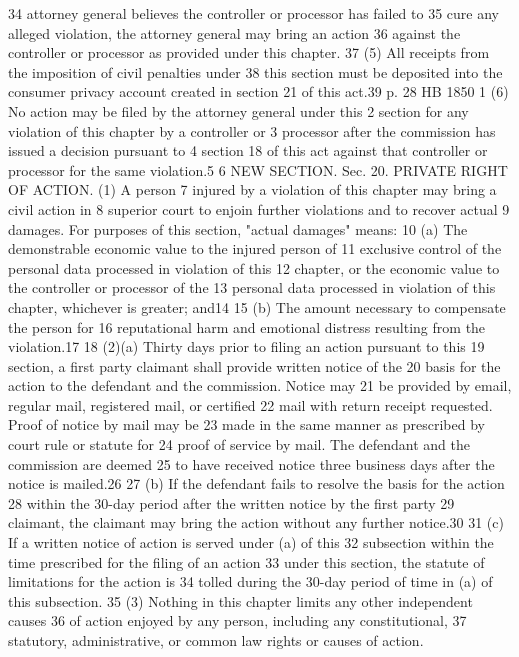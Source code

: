 34 attorney general believes the controller or processor has failed to
35 cure any alleged violation, the attorney general may bring an action
36 against the controller or processor as provided under this chapter.
37 (5) All receipts from the imposition of civil penalties under
38 this section must be deposited into the consumer privacy account
created in section 21 of this act.39
p. 28 HB 1850
1 (6) No action may be filed by the attorney general under this
2 section for any violation of this chapter by a controller or
3 processor after the commission has issued a decision pursuant to
4 section 18 of this act against that controller or processor for the
same violation.5
6 NEW SECTION. Sec. 20. PRIVATE RIGHT OF ACTION. (1) A person
7 injured by a violation of this chapter may bring a civil action in
8 superior court to enjoin further violations and to recover actual
9 damages. For purposes of this section, "actual damages" means:
10 (a) The demonstrable economic value to the injured person of
11 exclusive control of the personal data processed in violation of this
12 chapter, or the economic value to the controller or processor of the
13 personal data processed in violation of this chapter, whichever is
greater; and14
15 (b) The amount necessary to compensate the person for
16 reputational harm and emotional distress resulting from the
violation.17
18 (2)(a) Thirty days prior to filing an action pursuant to this
19 section, a first party claimant shall provide written notice of the
20 basis for the action to the defendant and the commission. Notice may
21 be provided by email, regular mail, registered mail, or certified
22 mail with return receipt requested. Proof of notice by mail may be
23 made in the same manner as prescribed by court rule or statute for
24 proof of service by mail. The defendant and the commission are deemed
25 to have received notice three business days after the notice is
mailed.26
27 (b) If the defendant fails to resolve the basis for the action
28 within the 30-day period after the written notice by the first party
29 claimant, the claimant may bring the action without any further
notice.30
31 (c) If a written notice of action is served under (a) of this
32 subsection within the time prescribed for the filing of an action
33 under this section, the statute of limitations for the action is
34 tolled during the 30-day period of time in (a) of this subsection.
35 (3) Nothing in this chapter limits any other independent causes
36 of action enjoyed by any person, including any constitutional,
37 statutory, administrative, or common law rights or causes of action.
